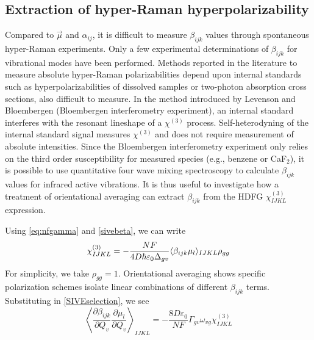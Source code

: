 \documentclass[aip, jcp, reprint, onecolumn, nofootinbib]{revtex4-2}
\begin{document}
\subsection{Extraction of hyper-Raman hyperpolarizability}

Compared to $\vec{\mu}$ and $\alpha_{ij}$, it is difficult to measure $\beta_{ijk}$ values through spontaneous hyper-Raman experiments.\cite{Kelley2010}
Only a few experimental determinations of $\beta_{ijk}$ for vibrational modes have been performed.\cite{Xu1997, Shoute2005, Kelley2010}
Methods reported in the literature to measure absolute hyper-Raman polarizabilities depend upon internal standards such as hyperpolarizabilities of dissolved samples or two-photon absorption cross sections, also difficult to measure. \cite{Kelley2010} 
In the method introduced by Levenson and Bloembergen (Bloembergen interferometry experiment), an internal standard interferes with the resonant lineshape of a $\chi^{(3)}$ process. \cite{Levenson1974_1, Levenson1974_2}
Self-heterodyning of the internal standard signal measures $\chi^{(3)}$ and does not require measurement of absolute intensities. 
Since the Bloembergen interferometry experiment only relies on the third order susceptibility for measured species (e.g., benzene or CaF$_2$),\cite{Levenson1974_2} it is possible to use quantitative four wave mixing spectroscopy to calculate $\beta_{ijk}$ values for infrared active vibrations.
It is thus useful to investigate how a treatment of orientational averaging can extract $\beta_{ijk}$ from the HDFG $\chi^{(3)}_{IJKL}$ expression.

Using \autoref{eq:nfgamma} and \autoref{sivebeta}, we can write
\begin{equation}\label{chi3}
		\chi^{(3)}_{IJKL} = -\frac{NF}{4D \hbar \varepsilon_0 \Delta_{gv}} \langle \beta_{ijk} \mu_l \rangle_{IJKL} \rho_{gg}\\
\end{equation}
For simplicity, we take $\rho_{gg} = 1$.
Orientational averaging shows specific polarization schemes isolate linear combinations of different $\beta_{ijk}$ terms. \cite{Bersohn1966, Willetts1992, Kauranen1996}
Substituting in \autoref{SIVEselection}, we see
\begin{equation}\label{betasive}
	\left\langle \frac{\partial \beta_{ijk}}{\partial Q_v} {\frac{\partial \mu_l}{\partial Q_v}} \right\rangle_{IJKL} = -\frac{8D \varepsilon_0}{NF}  {\Gamma_{gv} \omega_{vg}} \chi^{(3)}_{IJKL}
\end{equation}
\end{document}
